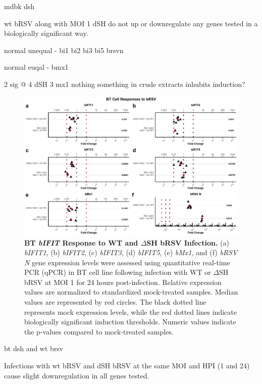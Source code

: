 mdbk dsh

wt bRSV along with MOI 1 dSH do not up or downregulate any genes tested in a biologically significant way.

normal unequal - bi1 bi2 bi3 bi5 brsvn

normal euqal - bmx1


2 sig @ 4 dSH
3 mx1 nothing
something in crude extracts inhubits induction?


\begin{figure}
    \centering
    \includegraphics[width=1\linewidth]{07. Chapter 2/Figs/02. Induction/09. bt_brsv.pdf}
    \caption[BT \textit{bIFIT} Response to WT and \(\Delta\)SH bRSV Infection.]{\textbf{BT \textit{bIFIT} Response to WT and \(\Delta\)SH bRSV Infection.} (a) \textit{bIFIT1}, (b) \textit{bIFIT2}, (c) \textit{bIFIT3}, (d) \textit{bIFIT5}, (e) \textit{bMx1}, and (f) \textit{bRSV N} gene expression levels were assessed using quantitative real-time PCR (qPCR) in BT cell line following infection with WT or \(\Delta\)SH bRSV at MOI 1 for 24 hours post-infection. Relative expression values are normalized to standardized mock-treated samples. Median values are represented by red circles. The black dotted line represents mock expression levels, while the red dotted lines indicate biologically significant induction thresholds. Numeric values indicate the p-values compared to mock-treated samples.}
    \label{fig:BT responses to bRSV}
\end{figure}

bt dsh and wt brsv

Infections with wt bRSV and dSH bRSV at the same MOI and HPI (1 and 24) cause slight downregulation in all genes tested.

